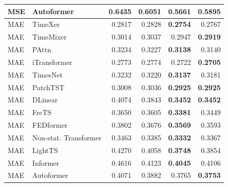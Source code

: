 \begin{longtable}{llrrrr}
MSE & Autoformer & 0.6435 & 0.6051 & \textbf{0.5661} & 0.5895 \\
\midrule
MAE & TimeXer & 0.2817 & 0.2828 & \textbf{0.2754} & 0.2767 \\
MAE & TimeMixer & 0.3014 & 0.3037 & 0.2947 & \textbf{0.2919} \\
MAE & PAttn & 0.3234 & 0.3227 & \textbf{0.3138} & 0.3140 \\
MAE & iTransformer & 0.2773 & 0.2774 & 0.2722 & \textbf{0.2705} \\
MAE & TimesNet & 0.3232 & 0.3220 & \textbf{0.3137} & 0.3181 \\
MAE & PatchTST & 0.3008 & 0.3036 & \textbf{0.2925} & \textbf{0.2925} \\
MAE & DLinear & 0.4074 & 0.3843 & \textbf{0.3452} & \textbf{0.3452} \\
MAE & FreTS & 0.3650 & 0.3605 & \textbf{0.3381} & 0.3449 \\
MAE & FEDformer & 0.3802 & 0.3676 & \textbf{0.3569} & 0.3593 \\
MAE & Non-stat. Transformer & 0.3463 & 0.3385 & \textbf{0.3332} & 0.3367 \\
MAE & LightTS & 0.4270 & 0.4058 & \textbf{0.3748} & 0.3854 \\
MAE & Informer & 0.4616 & 0.4123 & \textbf{0.4045} & 0.4106 \\
MAE & Autoformer & 0.4071 & 0.3882 & 0.3765 & \textbf{0.3753} \\
\end{longtable}
\endgroup

